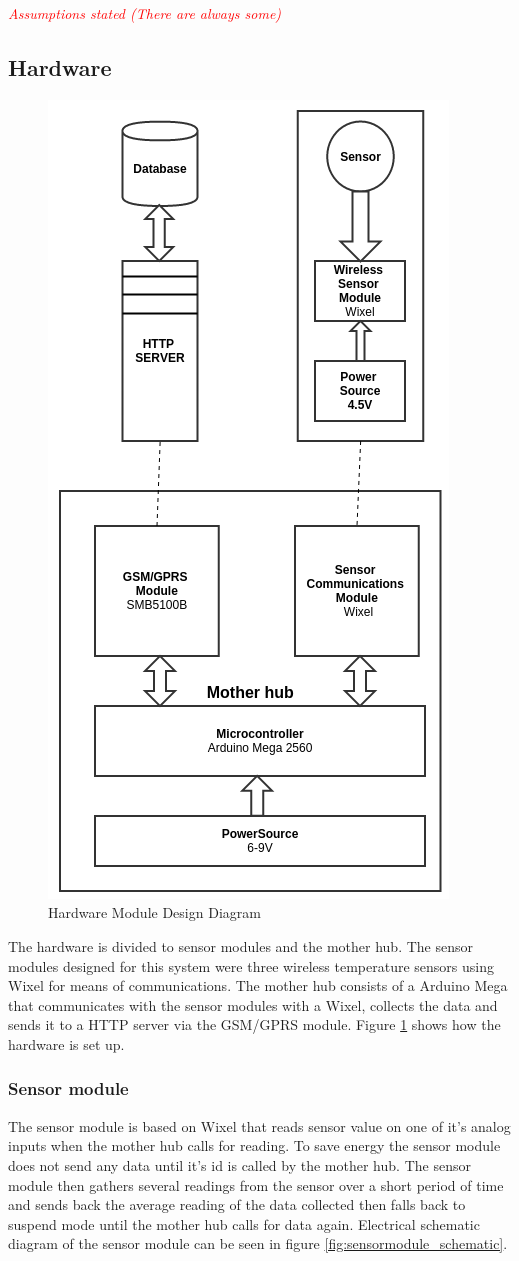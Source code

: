 \textit{\textcolor{red}{Assumptions stated (There are always some)}}


\subsection{Hardware}
\begin{figure}
\centering
\includegraphics[width=0.5\linewidth]{graphics/HardwareMDD}
\caption{Hardware Module Design Diagram\label{fig:HardwareMDD}}
\end{figure}

The hardware is divided to sensor modules and the mother hub. The sensor modules 
designed for this system were three wireless temperature sensors using Wixel\cite{wixel}
for means of communications. The mother hub consists of a Arduino Mega\cite{arduinoMega}
that communicates with the sensor modules with a Wixel, collects the data 
and sends it to a HTTP server via the GSM/GPRS module\cite{SM5100B}. 
Figure \ref{fig:HardwareMDD} shows how the hardware is set up. 

\subsubsection{Sensor module}
The sensor module is based on Wixel\cite{wixel} that reads sensor value on one of it's
analog inputs when the mother hub calls for reading. To save energy the sensor module does
not send any data until it's id is called by the mother hub. The sensor module then 
gathers several readings from the sensor over a short period of time and sends back the 
average reading of the data collected then falls back to suspend mode until the mother 
hub calls for data again. Electrical schematic diagram of the sensor module can
be seen in figure \ref{fig:sensormodule_schematic}.

